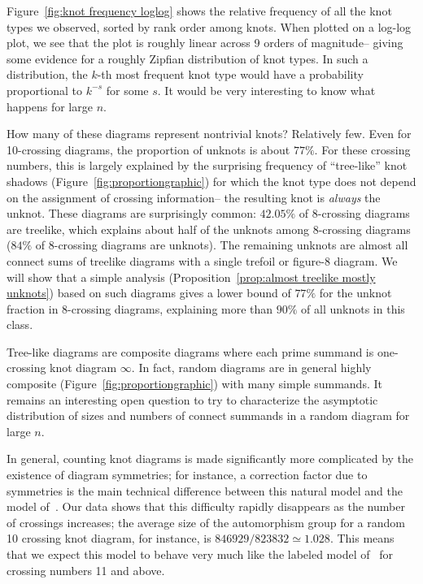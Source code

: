 \documentclass[amsmath,secnumarabic,floatfix,amssymb,nofootinbib,nobibnotes,letterpaper,11pt,tightenlines,showkeys]{revtex4}
\theoremstyle{definition}
\begin{document}
Figure~\ref{fig:knot frequency loglog} shows the relative frequency of all the knot types we observed, sorted by rank order among knots. When plotted on a log-log plot, we see that the plot is roughly linear across 9 orders of magnitude-- giving some evidence for a roughly Zipfian distribution of knot types. In such a distribution, the $k$-th most frequent knot type would have a probability proportional to $k^{-s}$ for some $s$. It would be very interesting to know what happens for large $n$.

How many of these diagrams represent nontrivial knots? Relatively few. Even for 10-crossing diagrams, the proportion of unknots is about $77\%$. For these crossing numbers, this is largely explained by the surprising frequency of ``tree-like'' knot shadows (Figure~\ref{fig:proportiongraphic}) for which the knot type does not depend on the assignment of crossing information-- the resulting knot is \emph{always} the unknot. These diagrams are surprisingly common: $42.05\%$ of 8-crossing diagrams are treelike, which explains about half of the unknots among 8-crossing diagrams ($84\%$ of 8-crossing diagrams are unknots). The remaining unknots are almost all connect sums of treelike diagrams with a single trefoil or figure-8 diagram. We will show that a simple analysis (Proposition~\ref{prop:almost treelike mostly unknots}) based on such diagrams gives a lower bound of $77\%$ for the unknot fraction in 8-crossing diagrams, explaining more than $90\%$ of all unknots in this class. 

Tree-like diagrams are composite diagrams where each prime summand is one-crossing knot diagram $\infty$. In fact, random diagrams are in general highly composite (Figure~\ref{fig:proportiongraphic}) with many simple summands. It remains an interesting open question to try to characterize the asymptotic distribution of sizes and numbers of connect summands in a random diagram for large $n$.

In general, counting knot diagrams is made significantly more complicated by the existence of diagram symmetries; for instance, a correction factor due to symmetries is the main technical difference between this natural model and the model of~\cite{Schaeffer:2004tt}. Our data shows that this difficulty rapidly disappears as the number of crossings increases; the average size of the automorphism group for a random 10 crossing knot diagram, for instance, is $846929/823832 \simeq 1.028$. This means that we expect this model to behave very much like the labeled model of~\cite{Schaeffer:2004tt} for crossing numbers 11 and above.
\end{document}
